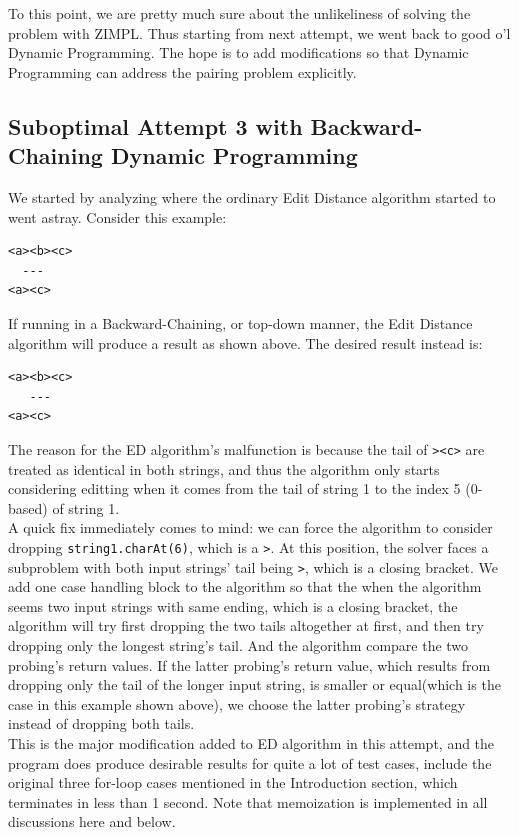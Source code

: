 \documentclass{article}
\begin{document}
To this point, we are pretty much sure about the unlikeliness of solving the problem with ZIMPL. Thus starting from next attempt, we went back to good o'l Dynamic Programming. The hope is to add modifications so that Dynamic Programming can address the pairing problem explicitly.

\subsection{Suboptimal Attempt 3 with Backward-Chaining Dynamic Programming}
We started by analyzing where the ordinary Edit Distance algorithm started to went astray. Consider this example:
\begin{lstlisting}
<a><b><c>
  ---
<a><c>
\end{lstlisting}
If running in a Backward-Chaining, or top-down manner, the Edit Distance algorithm will produce a result as shown above. The desired result instead is:
\begin{lstlisting}
<a><b><c>
   ---
<a><c>
\end{lstlisting}
The reason for the ED algorithm's malfunction is because the tail of \texttt{><c>} are treated as identical in both strings, and thus the algorithm only starts considering editting when it comes from the tail of string 1 to the index 5 (0-based) of string 1.\\

A quick fix immediately comes to mind: we can force the algorithm to consider dropping \texttt{string1.charAt(6)}, which is a \texttt{>}. At this position, the solver faces a subproblem with both input strings' tail being \texttt{>}, which is a closing bracket. We add one case handling block to the algorithm so that the when the algorithm seems two input strings with same ending, which is a closing bracket, the algorithm will try first dropping the two tails altogether at first, and then try dropping only the longest string's tail. And the algorithm compare the two probing's return values. If the latter probing's return value, which results from dropping only the tail of the longer input string, is smaller or equal(which is the case in this example shown above), we choose the latter probing's strategy instead of dropping both tails. \\

This is the major modification added to ED algorithm in this attempt, and the program does produce desirable results for quite a lot of test cases, include the original three for-loop cases mentioned in the Introduction section, which terminates in less than 1 second. Note that memoization is implemented in all discussions here and below. \\
\end{document}
